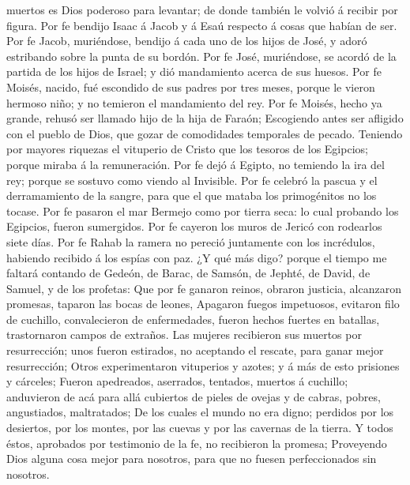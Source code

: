 muertos es Dios poderoso para levantar; de donde también le volvió á
recibir por figura.  Por fe bendijo Isaac á Jacob y á Esaú
respecto á cosas que habían de ser.  Por fe Jacob,
muriéndose, bendijo á cada uno de los hijos de José, y adoró estribando
sobre la punta de su bordón.  Por fe José, muriéndose, se
acordó de la partida de los hijos de Israel; y dió mandamiento acerca de
sus huesos.  Por fe Moisés, nacido, fué escondido de sus
padres por tres meses, porque le vieron hermoso niño; y no temieron el
mandamiento del rey.  Por fe Moisés, hecho ya grande,
rehusó ser llamado hijo de la hija de Faraón;  Escogiendo
antes ser afligido con el pueblo de Dios, que gozar de comodidades
temporales de pecado.  Teniendo por mayores riquezas el
vituperio de Cristo que los tesoros de los Egipcios; porque miraba á la
remuneración.  Por fe dejó á Egipto, no temiendo la ira del
rey; porque se sostuvo como viendo al Invisible.  Por fe
celebró la pascua y el derramamiento de la sangre, para que el que
mataba los primogénitos no los tocase.  Por fe pasaron el
mar Bermejo como por tierra seca: lo cual probando los Egipcios, fueron
sumergidos.  Por fe cayeron los muros de Jericó con
rodearlos siete días.  Por fe Rahab la ramera no pereció
juntamente con los incrédulos, habiendo recibido á los espías con paz.
 ¿Y qué más digo? porque el tiempo me faltará contando de
Gedeón, de Barac, de Samsón, de Jephté, de David, de Samuel, y de los
profetas:  Que por fe ganaron reinos, obraron justicia,
alcanzaron promesas, taparon las bocas de leones,  Apagaron
fuegos impetuosos, evitaron filo de cuchillo, convalecieron de
enfermedades, fueron hechos fuertes en batallas, trastornaron campos de
extraños.  Las mujeres recibieron sus muertos por
resurrección; unos fueron estirados, no aceptando el rescate, para ganar
mejor resurrección;  Otros experimentaron vituperios y
azotes; y á más de esto prisiones y cárceles;  Fueron
apedreados, aserrados, tentados, muertos á cuchillo; anduvieron de acá
para allá cubiertos de pieles de ovejas y de cabras, pobres,
angustiados, maltratados;  De los cuales el mundo no era
digno; perdidos por los desiertos, por los montes, por las cuevas y por
las cavernas de la tierra.  Y todos éstos, aprobados por
testimonio de la fe, no recibieron la promesa;  Proveyendo
Dios alguna cosa mejor para nosotros, para que no fuesen perfeccionados
sin nosotros.

